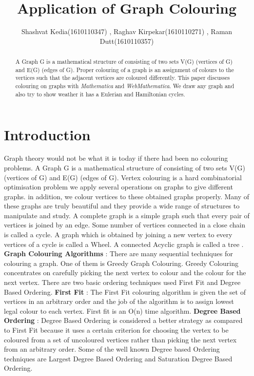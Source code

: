 \documentclass{article}
\begin{document}
\title{Application of Graph Colouring}
\author{Shashvat Kedia(1610110347) , Raghav Kirpekar(1610110271) ,  Raman Dutt(1610110357)}
\maketitle
\begin{abstract}
A Graph G is a mathematical structure of consisting of two sets V(G) (vertices of G) and E(G) (edges of G). Proper colouring of a graph is an assignment of colours to the vertices such that the adjacent vertices are coloured differently.
This paper discusses colouring on graphs with \textit{Mathematica} and \textit{WebMathematica}. \hfill \break
We draw any graph and also try to show weather it has a Eulerian and Hamiltonian cycles.
\end{abstract}
\section{Introduction}
Graph theory would not be what it is today if there had been no colouring problems. A Graph G is a mathematical structure of consisting of two sets V(G) (vertices of G) and E(G) (edges of G).\hfill \break
Vertex colouring is a hard combinatorial optimisation problem we apply several operations on graphs to give different graphs. in addition, we colour vertices to these obtained graphs properly. Many of these graphs are truly beautiful and they provide a wide range of structures to manipulate and study.\hfill \break
A complete graph is a simple graph such that every pair of vertices is joined by an edge. Some number of vertices connected in a close chain is called a cycle. A graph which is obtained by joining a new vertex to every vertices of a cycle is called a Wheel. A connected Acyclic graph is called a tree \cite{1}. \hfill \break
\textbf{Graph Colouring Algorithms} : There are many sequential techniques for colouring a graph. One of them is Greedy Graph Colouring. Greedy Colouring concentrates on carefully picking the next vertex to colour and the colour for the next vertex. There are two basic ordering techniques used First Fit and Degree Based Ordering.\hfill \break
\textbf{First Fit} : The First Fit colouring algorithm is given the set of vertices in an arbitrary order and the job of the algorithm is to assign lowest legal colour to each vertex. First fit is an O(n) time algorithm. \hfill \break
\textbf{Degree Based Ordering} : Degree Based Ordering is considered a better strategy as compared to First Fit because it uses a certain criterion for choosing the vertex to be coloured from a set of uncoloured vertices rather than picking the next vertex from an arbitrary order. Some of the well known Degree based Ordering techniques are Largest Degree Based Ordering and Saturation Degree Based Ordering.\hfill \break
\end{document}
